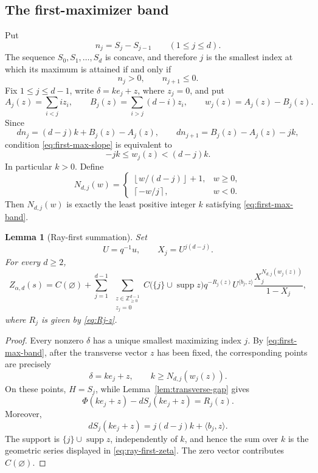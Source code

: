 \documentclass[11pt]{amsart}
\newcommand{\ZZ}{\mathbb Z}
\newcommand{\supp}{\operatorname{supp}}
\theoremstyle{plain}
\newtheorem{lemma}[theorem]{Lemma}
\theoremstyle{definition}
\numberwithin{equation}{section}
\begin{document}
\begin{appendix}
\subsection{The first-maximizer band}

Put
\[
  n_j=S_j-S_{j-1}\qquad(1\le j\le d).
\]
The sequence \(S_0,S_1,\ldots,S_d\) is concave, and therefore \(j\) is the smallest index
at which its maximum is attained if and only if
\begin{equation}\label{eq:first-max-slope}
  n_j>0,\qquad n_{j+1}\le0.
\end{equation}
Fix \(1\le j\le d-1\), write \(\delta=ke_j+z\), where \(z_j=0\), and put
\begin{equation}\label{eq:ABw}
  A_j(z)=\sum_{i<j}iz_i,\qquad
  B_j(z)=\sum_{i>j}(d-i)z_i,\qquad
  w_j(z)=A_j(z)-B_j(z).
\end{equation}
Since
\[
  dn_j=(d-j)k+B_j(z)-A_j(z),\qquad
  dn_{j+1}=B_j(z)-A_j(z)-jk,
\]
condition \eqref{eq:first-max-slope} is equivalent to
\begin{equation}\label{eq:first-max-band}
  -jk\le w_j(z)<(d-j)k.
\end{equation}
In particular \(k>0\).  Define
\begin{equation}\label{eq:Njw}
  N_{d,j}(w)=
  \begin{cases}
    \left\lfloor w/(d-j)\right\rfloor+1,&w\ge0,\\[2mm]
    \left\lceil -w/j\right\rceil,&w<0.
  \end{cases}
\end{equation}
Then \(N_{d,j}(w)\) is exactly the least positive integer \(k\) satisfying
\eqref{eq:first-max-band}.

\begin{lemma}[Ray-first summation]\label{lem:ray-first-summation}
Set
\[
  U=q^{-1}u,\qquad X_j=U^{j(d-j)}.
\]
For every \(d\ge2\),
\begin{equation}\label{eq:ray-first-zeta}
  Z_{\alpha,d}(s)
  =
  C(\varnothing)+
  \sum_{j=1}^{d-1}\;
  \sum_{\substack{z\in\ZZ_{\ge0}^{d-1}\\z_j=0}}
  C\bigl(\{j\}\cup\supp z\bigr)q^{-R_j(z)}
  U^{\langle b_j,z\rangle}
  \frac{X_j^{N_{d,j}(w_j(z))}}{1-X_j},
\end{equation}
where \(R_j\) is given by \eqref{eq:Rj-z}.
\end{lemma}

\begin{proof}
Every nonzero \(\delta\) has a unique smallest maximizing index \(j\).  By
\eqref{eq:first-max-band}, after the transverse vector \(z\) has been fixed, the corresponding
points are precisely
\[
  \delta=ke_j+z,\qquad k\ge N_{d,j}(w_j(z)).
\]
On these points, \(H=S_j\), while Lemma~\ref{lem:transverse-gap} gives
\[
  \Phi(ke_j+z)-dS_j(ke_j+z)=R_j(z).
\]
Moreover,
\[
  dS_j(ke_j+z)=j(d-j)k+\langle b_j,z\rangle.
\]
The support is \(\{j\}\cup\supp z\), independently of \(k\), and hence the sum over \(k\)
is the geometric series displayed in \eqref{eq:ray-first-zeta}.  The zero vector contributes
\(C(\varnothing)\).
\end{proof}


\end{appendix}
\end{document}
